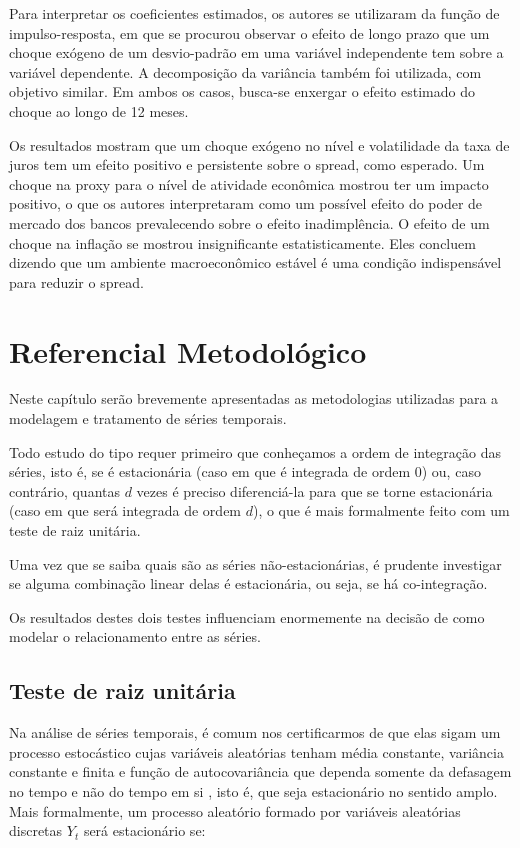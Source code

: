 \documentclass[a4paper, article, 12pt, openany, oneside, english, brazil]{abntex2}
\numberwithin{equation}{section}
\begin{document}
    Para interpretar os coeficientes estimados, os autores se utilizaram da função de impulso-resposta, em que se procurou observar o efeito de longo prazo que um choque exógeno de um desvio-padrão em uma variável independente tem sobre a variável dependente. A decomposição da variância também foi utilizada, com objetivo similar. Em ambos os casos, busca-se enxergar o efeito estimado do choque ao longo de 12 meses.

    Os resultados mostram que um choque exógeno no nível e volatilidade da taxa de juros tem um efeito positivo e persistente sobre o spread, como esperado. Um choque na proxy para o nível de atividade econômica mostrou ter um impacto positivo, o que os autores interpretaram como um possível efeito do poder de mercado dos bancos prevalecendo sobre o efeito inadimplência. O efeito de um choque na inflação se mostrou insignificante estatisticamente. Eles concluem dizendo que um ambiente macroeconômico estável é uma condição indispensável para reduzir o spread.

\section{Referencial Metodológico}

    Neste capítulo serão brevemente apresentadas as metodologias utilizadas para a modelagem e tratamento de séries temporais.

    Todo estudo do tipo requer primeiro que conheçamos a ordem de integração das séries, isto é, se é estacionária (caso em que é integrada de ordem 0) ou, caso contrário, quantas $d$ vezes é preciso diferenciá-la para que se torne estacionária (caso em que será integrada de ordem $d$), o que é mais formalmente feito com um teste de raiz unitária.

    Uma vez que se saiba quais são as séries não-estacionárias, é prudente investigar se alguma combinação linear delas é estacionária, ou seja, se há co-integração.

    Os resultados destes dois testes influenciam enormemente na decisão de como modelar o relacionamento entre as séries. 


\subsection{Teste de raiz unitária}

    Na análise de séries temporais, é comum nos certificarmos de que elas sigam um processo estocástico cujas variáveis aleatórias tenham média constante, variância constante e finita e função de autocovariância que dependa somente da defasagem no tempo e não do tempo em si \cite[p.~734]{gujarati}, isto é, que seja estacionário no sentido amplo. Mais formalmente, um processo aleatório formado por variáveis aleatórias discretas $Y_t$ será estacionário se:
\end{document}
